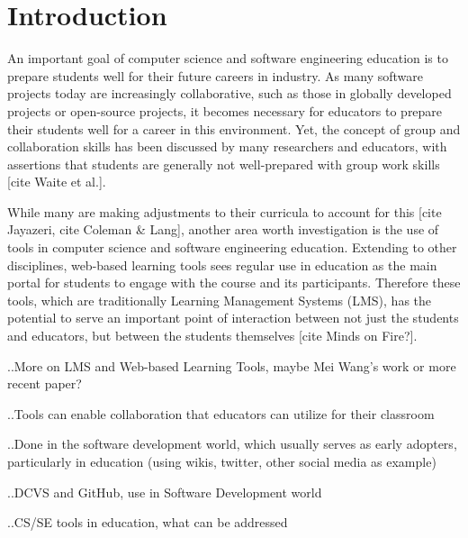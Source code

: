 \section{Introduction}

An important goal of computer science and software engineering education is to prepare students well for their future careers in industry. As many software projects today are increasingly collaborative, such as those in globally developed projects or open-source projects, it becomes necessary for educators to prepare their students well for a career in this environment. Yet, the concept of group and collaboration skills has been discussed by many researchers and educators, with assertions that students are generally not well-prepared with group work skills [cite Waite et al.].

While many are making adjustments to their curricula to account for this [cite Jayazeri, cite Coleman & Lang], another area worth investigation is the use of tools in computer science and software engineering education. Extending to other disciplines, web-based learning tools sees regular use in education as the main portal for students to engage with the course and its participants. Therefore these tools, which are traditionally Learning Management Systems (LMS), has the potential to serve an important point of interaction between not just the students and educators, but between the students themselves [cite Minds on Fire?].

..More on LMS and Web-based Learning Tools, maybe Mei Wang's work or more recent paper?

..Tools can enable collaboration that educators can utilize for their classroom

..Done in the software development world, which usually serves as early adopters, particularly in education (using wikis, twitter, other social media as example)

..DCVS and GitHub, use in Software Development world

..CS/SE tools in education, what can be addressed
